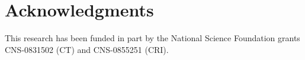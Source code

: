 \documentclass{sig-alternate}
\begin{document}
%



\small {\section*{Acknowledgments}

This research has been funded in part by the National Science
Foundation grants CNS-0831502 (CT) and CNS-0855251 (CRI).}

\small{


}
\end{document}

